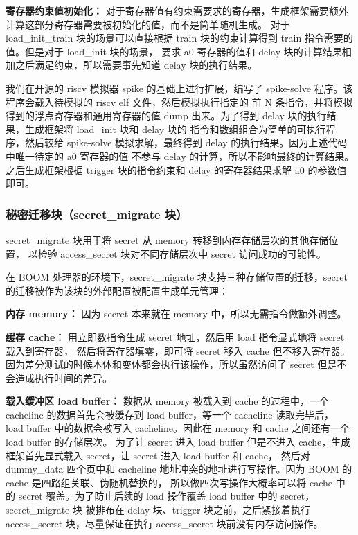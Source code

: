 \textbf{寄存器约束值初始化：}
对于寄存器值有约束需要求的寄存器，生成框架需要额外计算这部分寄存器需要被初始化的值，而不是简单随机生成。
对于 load\_init\_train 块的场景可以直接根据 train 块的约束计算得到 train 指令需要的值。但是对于 load\_init 块的场景，
要求 a0 寄存器的值和 delay 块的计算结果相加之后满足约束，所以需要事先知道 delay 块的执行结果。\par

我们在开源的 riscv 模拟器 spike 的基础上进行扩展，编写了 spike-solve 程序。该程序会载入待模拟的 riscv elf 文件，然后模拟执行指定的
前 N 条指令，并将模拟得到的浮点寄存器和通用寄存器的值 dump 出来。为了得到 delay 块的执行结果，生成框架将 load\_init 块和 delay 块的
指令和数组组合为简单的可执行程序，然后较给 spike-solve 模拟求解，最终得到 delay 的执行结果。因为上述代码中唯一待定的 a0 寄存器的值
不参与 delay 的计算，所以不影响最终的计算结果。之后生成框架根据 trigger 块的指令约束和 delay 的寄存器结果求解 a0 的参数值即可。

\subsubsection{秘密迁移块（secret\_migrate 块）}
secret\_migrate 块用于将 secret 从 memory 转移到内存存储层次的其他存储位置，
以检验 access\_secret 块对不同存储层次中 secret 访问成功的可能性。\par

在 BOOM 处理器的环境下，secret\_migrate 块支持三种存储位置的迁移，secret 的迁移被作为该块的外部配置被配置生成单元管理：\par
\textbf{内存 memory：}
因为 secret 本来就在 memory 中，所以无需指令做额外调整。\par

\textbf{缓存 cache：} 
用立即数指令生成 secret 地址，然后用 load 指令显式地将 secret 载入到寄存器，
然后将寄存器填零，即可将 secret 移入 cache 但不移入寄存器。
因为差分测试的时候本体和变体都会执行该操作，所以虽然访问了 secret 但是不会造成执行时间的差异。\par

\textbf{载入缓冲区 load buffer：}
数据从 memory 被载入到 cache 的过程中，一个 cacheline 的数据首先会被缓存到 load buffer，等一个 cacheline 读取完毕后，
load buffer 中的数据会被写入 cacheline。因此在 memory 和 cache 之间还有一个 load buffer 的存储层次。
为了让 secret 进入 load buffer 但是不进入 cache，生成框架首先显式载入 secret，让 secret 进入 load buffer 和 cache，
然后对 dummy\_data 四个页中和 cacheline 地址冲突的地址进行写操作。因为 BOOM 的 cache 是四路组关联、伪随机替换的，
所以做四次写操作大概率可以将 cache 中的 secret 覆盖。为了防止后续的 load 操作覆盖 load buffer 中的 secret，secret\_migrate 块
被排布在 delay 块、trigger 块之前，之后紧接着执行 access\_secret 块，尽量保证在执行 access\_secret 块前没有内存访问操作。\par

